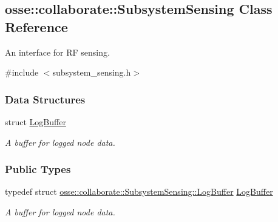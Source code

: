 \hypertarget{classosse_1_1collaborate_1_1_subsystem_sensing}{}\subsection{osse\+:\+:collaborate\+:\+:Subsystem\+Sensing Class Reference}
\label{classosse_1_1collaborate_1_1_subsystem_sensing}


An interface for RF sensing.  




{\ttfamily \#include $<$subsystem\+\_\+sensing.\+h$>$}

\subsubsection*{Data Structures}
\begin{DoxyCompactItemize}
\item 
struct \hyperlink{structosse_1_1collaborate_1_1_subsystem_sensing_1_1_log_buffer}{Log\+Buffer}
\begin{DoxyCompactList}\small\item\em A buffer for logged node data. \end{DoxyCompactList}\end{DoxyCompactItemize}
\subsubsection*{Public Types}
\begin{DoxyCompactItemize}
\item 
\mbox{\label{classosse_1_1collaborate_1_1_subsystem_sensing_a40c7c3573a1e53e3d1b5455c51a79b70}} 
typedef struct \hyperlink{structosse_1_1collaborate_1_1_subsystem_sensing_1_1_log_buffer}{osse\+::collaborate\+::\+Subsystem\+Sensing\+::\+Log\+Buffer} \hyperlink{classosse_1_1collaborate_1_1_subsystem_sensing_a40c7c3573a1e53e3d1b5455c51a79b70}{Log\+Buffer}
\begin{DoxyCompactList}\small\item\em A buffer for logged node data. \end{DoxyCompactList}\end{DoxyCompactItemize}
